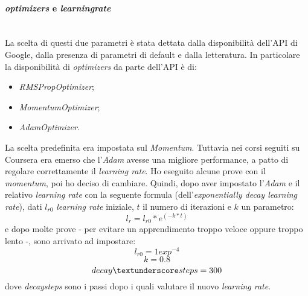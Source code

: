         \paragraph{\textit{optimizers} e \textit{learning\textunderscore rate}}
        ~\\La scelta di questi due parametri è stata dettata dalla disponibilità dell'API di Google, dalla presenza di parametri di default e dalla letteratura. In particolare la disponibilità di \textit{optimizers} da parte dell'API è di:
        \begin{itemize}
            \item \textit{RMSPropOptimizer}\cite{site:RMSProp-optimizer};
            \item \textit{MomentumOptimizer}\cite{site:momentum-optimizer};
            \item \textit{AdamOptimizer}\cite{site:adam-optimizer}.
        \end{itemize}
        La scelta predefinita era impostata sul \textit{Momentum}. Tuttavia nei corsi seguiti su Coursera era emerso che l'\textit{Adam} avesse una migliore performance, a patto di regolare correttamente il \textit{learning rate}. Ho eseguito alcune prove con il \textit{momentum}, poi ho deciso di cambiare. Quindi, dopo aver impostato l'\textit{Adam} e il relativo \textit{learning rate} con la seguente formula (dell'\textit{exponentially decay learning rate}), dati $l_{r0}$ \textit{learning rate} iniziale, $t$ il numero di iterazioni e $k$ un parametro:
        \[l_r=l_{r0} * e^{(-k*t)}\]
        e dopo molte prove - per evitare un apprendimento troppo veloce oppure troppo lento -, sono arrivato ad impostare:
        \[l_{r0}=1exp^{-4}\]
        \[k=0.8\]
        \[decay\textunderscore steps=300\]
        dove \textit{decay\textunderscore steps} sono i passi dopo i quali valutare il nuovo \textit{learning rate}.
        

